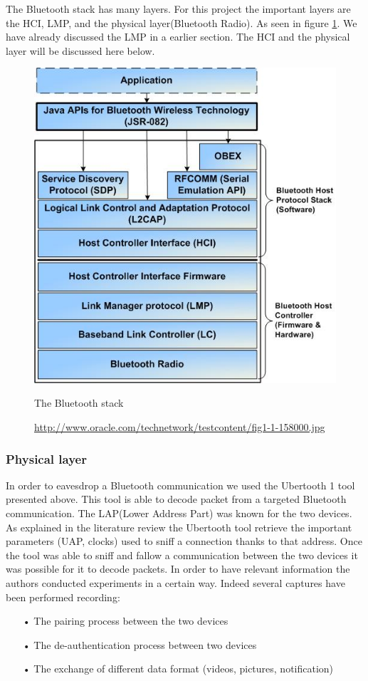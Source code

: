 The Bluetooth stack has many layers. For this project the important layers are the HCI, LMP, and the physical layer(Bluetooth Radio). As seen in figure \ref{fig:bt_stack}. We have already discussed the LMP in a earlier section. The HCI and the physical layer will be discussed here below.

\begin{figure}[h]
  \includegraphics[scale=0.8]{images/bluetoothstack.jpg}
  \caption{The Bluetooth stack}
  \label{fig:bt_stack}
  \caption*{\url{http://www.oracle.com/technetwork/testcontent/fig1-1-158000.jpg}}
\end{figure}

\subsubsection{Physical layer}
	In order to eavesdrop a Bluetooth communication we used the Ubertooth 1 tool presented above. This tool is able to decode packet from a targeted Bluetooth communication.
	The LAP(Lower Address Part) was known for the two devices. As explained in the literature review the Ubertooth tool retrieve the important parameters (UAP, clocks) used to sniff a connection thanks to that address. Once the tool was able to sniff and fallow a communication between the two devices it was possible for it to decode packets.
	In order to have relevant information the authors conducted experiments in a certain way. Indeed several captures have been performed recording:
\begin{itemize}
	\item[•] The pairing process between the two devices
	\item[•] The de-authentication process between two devices
	\item[•] The exchange of different data format (videos, pictures, notification) 
\end{itemize}
		 
